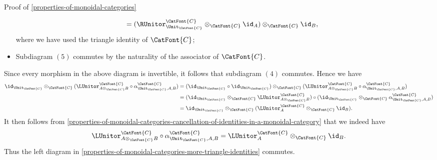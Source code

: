 \begin{Proof}{Proof of \cref{properties-of-monoidal-categories}}
\begin{itemize}
\begin{align*}
                                                                                                        &= (\RUnitor^{\CatFont{C}}_{\Unit_{\CatFont{C}}}\otimes_{\CatFont{C}}\id_{A})\otimes_{\CatFont{C}}\id_{B},
            \end{align*}
            where we have used the triangle identity of $\CatFont{C}$;
        \item Subdiagram $(5)$ commutes by the naturality of the associator of $\CatFont{C}$.
    \end{itemize}
    Since every morphism in the above diagram is invertible, it follows that subdiagram $(4)$ commutes. Hence we have
    \begin{align*}
        \id_{\Unit_{\CatFont{C}}}\otimes_{\CatFont{C}}(\LUnitor^{\CatFont{C}}_{A\otimes_{\CatFont{C}}B}\circ\alpha^{\CatFont{C}}_{\Unit_{\CatFont{C}},A,B}) &= (\id_{\Unit_{\CatFont{C}}}\circ\id_{\Unit_{\CatFont{C}}})\otimes_{\CatFont{C}}(\LUnitor^{\CatFont{C}}_{A\otimes_{\CatFont{C}}B}\circ\alpha^{\CatFont{C}}_{\Unit_{\CatFont{C}},A,B})\\
                                        &= (\id_{\Unit_{\CatFont{C}}}\otimes_{\CatFont{C}}\LUnitor^{\CatFont{C}}_{A\otimes_{\CatFont{C}}B})\circ(\id_{\Unit_{\CatFont{C}}}\otimes_{\CatFont{C}}\alpha^{\CatFont{C}}_{\Unit_{\CatFont{C}},A,B})\\
                                        &= \id_{\Unit_{\CatFont{C}}}\otimes_{\CatFont{C}}(\LUnitor^{\CatFont{C}}_{A}\otimes_{\CatFont{C}}\id_{B}).
    \end{align*}
    It then follows from \cref{properties-of-monoidal-categories-cancellation-of-identities-in-a-monoidal-category} that we indeed have
    \[
        \LUnitor^{\CatFont{C}}_{A\otimes_{\CatFont{C}}B}\circ\alpha^{\CatFont{C}}_{\Unit_{\CatFont{C}},A,B}
        =
        \LUnitor^{\CatFont{C}}_{A}\otimes_{\CatFont{C}}\id_{B}.
    \]
    Thus the left diagram in \cref{properties-of-monoidal-categories-more-triangle-identities} commutes.%


\end{Proof}
